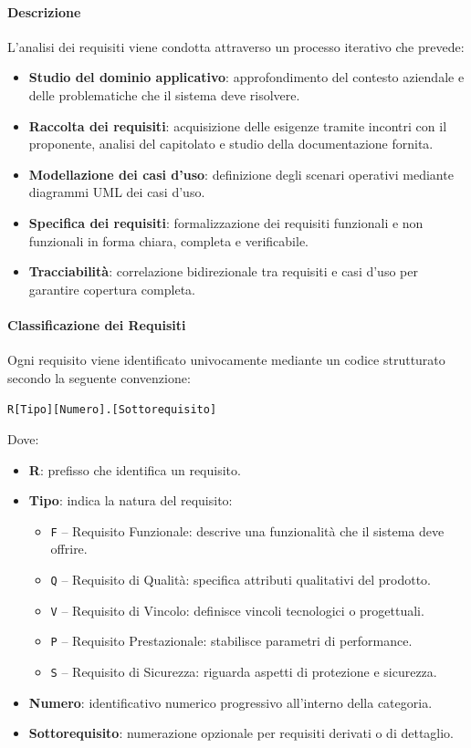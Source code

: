 \documentclass[a4paper, 11pt, oneside]{scrartcl} %
\begin{document}
\paragraph{Descrizione}
L'analisi dei requisiti viene condotta attraverso un processo iterativo che prevede:
\begin{itemize}
    \item \textbf{Studio del dominio applicativo}: approfondimento del contesto aziendale e delle problematiche che il sistema deve risolvere.
    \item \textbf{Raccolta dei requisiti}: acquisizione delle esigenze tramite incontri con il proponente, analisi del capitolato{\scriptsize{}} e studio della documentazione fornita.
    \item \textbf{Modellazione dei casi d'uso}: definizione degli scenari operativi mediante diagrammi UML{\scriptsize{}} dei casi d'uso.
    \item \textbf{Specifica dei requisiti}: formalizzazione dei requisiti funzionali e non funzionali in forma chiara, completa e verificabile.
    \item \textbf{Tracciabilità}: correlazione bidirezionale tra requisiti e casi d'uso per garantire copertura completa.
\end{itemize}

\paragraph{Classificazione dei Requisiti}
Ogni requisito viene identificato univocamente mediante un codice strutturato secondo la seguente convenzione:

\begin{center}
\texttt{R[Tipo][Numero].[Sottorequisito]}
\end{center}

\noindent
Dove:
\begin{itemize}
    \item \textbf{R}: prefisso che identifica un requisito.
    \item \textbf{Tipo}: indica la natura del requisito:
    \begin{itemize}
        \item \texttt{F} – Requisito Funzionale: descrive una funzionalità che il sistema deve offrire.
        \item \texttt{Q} – Requisito di Qualità: specifica attributi qualitativi del prodotto.
        \item \texttt{V} – Requisito di Vincolo: definisce vincoli tecnologici o progettuali.
        \item \texttt{P} – Requisito Prestazionale: stabilisce parametri di performance.
        \item \texttt{S} – Requisito di Sicurezza: riguarda aspetti di protezione e sicurezza.
    \end{itemize}
    \item \textbf{Numero}: identificativo numerico progressivo all'interno della categoria.
    \item \textbf{Sottorequisito}: numerazione opzionale per requisiti derivati o di dettaglio.
\end{itemize}
\end{document}
